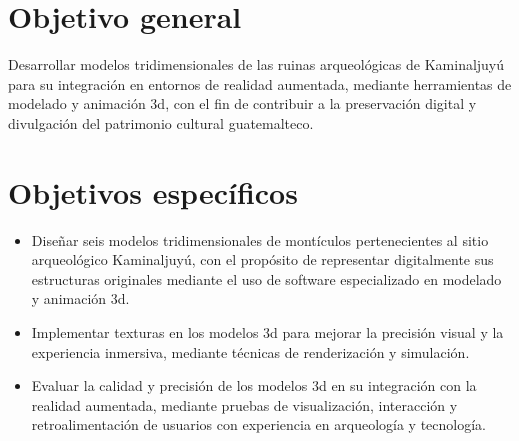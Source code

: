 
\section{Objetivo general}
Desarrollar modelos tridimensionales de las ruinas arqueológicas de Kaminaljuyú para su integración en entornos de realidad aumentada, mediante herramientas de modelado y animación \gls{3d}, con el fin de contribuir a la preservación digital y divulgación del patrimonio cultural guatemalteco.

\section{Objetivos específicos}
\begin{itemize}
    \item Diseñar seis modelos tridimensionales de montículos pertenecientes al sitio arqueológico Kaminaljuyú, con el propósito de representar digitalmente sus estructuras originales mediante el uso de software especializado en modelado y animación \gls{3d}.
    \item Implementar texturas en los modelos \gls{3d} para mejorar la precisión visual y la experiencia inmersiva, mediante técnicas de renderización y simulación.
    \item Evaluar la calidad y precisión de los modelos \gls{3d} en su integración con la realidad aumentada, mediante pruebas de visualización, interacción y retroalimentación de usuarios con experiencia en arqueología y tecnología.
\end{itemize}